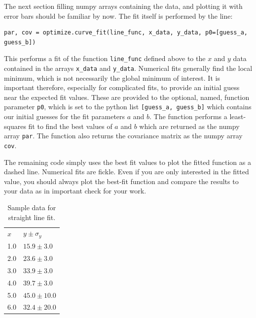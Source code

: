 The next section filling numpy arrays containing the data, and
plotting it with error bars should be familiar by now.  The fit itself
is performed by the line:
\begin{verbatim}
par, cov = optimize.curve_fit(line_func, x_data, y_data, p0=[guess_a, guess_b])
\end{verbatim}
This performs a fit of the function {\tt line{\_}func} defined above
to the $x$ and $y$ data contained in the arrays {\tt x{\_}data} and
{\tt y{\_}data}.  Numerical fits generally find the local minimum,
which is not necessarily the global minimum of interest.  It is
important therefore, especially for complicated fits, to provide an
initial guess near the expected fit values.  These are provided to the
optional, named, function parameter {\tt p0}, which is set to the
python list {\tt [guess{\_}a, guess{\_}b]} which contains our initial guesses for
the fit parameters $a$ and $b$.  The function performs a least-squares
fit to find the best values of $a$ and $b$ which are returned as the
numpy array {\tt par}.  The function also returns the covariance
matrix as the numpy array {\tt cov}.

The remaining code simply uses the best fit values to plot the fitted
function as a dashed line.  Numerical fits are fickle.  Even if you
are only interested in the fitted value, you should always plot the
best-fit function and compare the results to your data as in important
check for your work.

\begin{table}
\caption{Sample data for straight line fit.}
\label{tbl:linesamp}
\begin{center}
\begin{tabular}{ll}
$x$ & $y \pm \sigma_y$ \\
1.0  & $15.9 \pm 3.0$ \\
2.0  & $23.6 \pm 3.0$ \\
3.0  & $33.9 \pm 3.0$ \\
4.0  & $39.7 \pm 3.0$ \\
5.0  & $45.0 \pm 10.0$ \\
6.0  & $32.4 \pm 20.0$ \\
\end{tabular}
\end{center}
\end{table}

